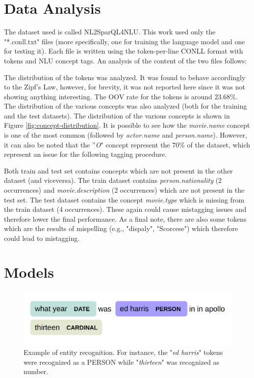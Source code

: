 \documentclass[11pt,a4paper]{article}
\begin{document}
\section{Data Analysis}

The dataset used is called NL2SparQL4NLU. This work used only the "*.conll.txt" files (more specifically, one for training the language model and one for testing it). Each file is written using the token-per-line CONLL format with tokens and NLU concept tags. An analysis of the content of the two files follows:

The distribution of the tokens was analyzed. It was found to behave accordingly to the
Zipf's Law, however, for brevity, it was not reported here since it was not showing 
anything interesting. The OOV rate for the tokens is around $23.68\%$. 
The distribution of the various concepts was also analyzed (both for the training
and the test datasets). The distribution of the various concepts is shown in Figure \ref{fig:concept-distribution}. It is possible to see how the \textit{movie.name} concept is one of the most common (followed by \textit{actor.name} and \textit{person.name}). However, it can also be noted that the ''\textit{O}" concept represent the $70\%$ of the dataset, which represent an issue for the following tagging procedure.

Both train and test set contains concepts which are not present in the other dataset (and viceversa). The train dataset contains \textit{person.nationality} (2 occurrences) and \textit{movie.description} (2 occurrences) which are not present in the test set. The test dataset contains the concept \textit{movie.type} which is missing from the train dataset (4 occurrences). These again could cause mistagging issues and therefore lower the final performance.
As a final note, there are also
some tokens which are the results of mispelling (e.g., "dispaly", "Scorcese") which therefore could lead to mistagging.


\section{Models}

\begin{figure}[b!]
\centering
	\includegraphics[width=1\linewidth]{img/entity}
	\caption{Example of entity recognition. For instance, the "\textit{ed harris}" tokens were recognized as a PERSON while "\textit{thirteen}" was recognized as number.}
	\label{fig:entity-recognition}
\end{figure}
\end{document}
